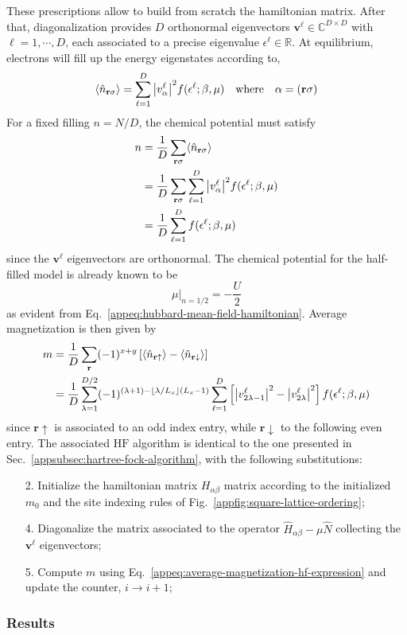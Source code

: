 These prescriptions allow to build from scratch the hamiltonian matrix. After that, diagonalization provides $D$ orthonormal eigenvectors $\mathbf{v}^\ell \in \mathbb{C}^{D \times D}$ with $\ell=1,\cdots,D$, each associated to a precise eigenvalue $\epsilon^\ell \in \mathbb{R}$. At equilibrium, electrons will fill up the energy eigenstates according to,
\[
	\langle
		\hat n_{\mathbf{r}\sigma}
	\rangle = \sum_{\ell=1}^D \abs{v_\alpha^\ell}^2 f(\epsilon^\ell;\beta,\mu)
	\qq{where}
	\alpha = (\mathbf{r}\sigma)
\]
For a fixed filling $n = N/D$, the chemical potential must satisfy
\[
\begin{aligned}
	n &= \frac{1}{D} \sum_{\mathbf{r}\sigma} \langle
		\hat n_{\mathbf{r}\sigma}
	\rangle \\
	&= \frac{1}{D} \sum_{\mathbf{r}\sigma} \sum_{\ell=1}^D \abs{v_\alpha^\ell}^2 f(\epsilon^\ell;\beta,\mu) \\
	&= \frac{1}{D} \sum_{\ell=1}^D f(\epsilon^\ell;\beta,\mu)
\end{aligned} 
\]
since the $\mathbf{v}^\ell$ eigenvectors are orthonormal. The chemical potential for the half-filled model is already known to be
\[
	\mu \big|_{n=1/2} = -\frac{U}{2}
\]
as evident from Eq.~\eqref{appeq:hubbard-mean-field-hamiltonian}. Average magnetization is then given by
\begin{align}
	m &= \frac{1}{D} \sum_{\mathbf{r}} (-1)^{x+y} \left[
		\langle
			\hat n_{\mathbf{r}\uparrow}
			\rangle - \langle
			\hat n_{\mathbf{r}\downarrow}
		\rangle
	\right] \nonumber \\
	&= \frac{1}{D} \sum_{\lambda=1}^{D/2} (-1)^{
		(\lambda+1) - \left\lfloor
			\lambda / L_x
		\right\rfloor (L_x-1)
	} \sum_{\ell=1}^D \left[
		\abs{v_{2\lambda-1}^\ell}^2 - \abs{v_{2\lambda}^\ell}^2
	\right] f(\epsilon^\ell;\beta,\mu) \label{appeq:average-magnetization-hf-expression}
\end{align}
since $\mathbf{r}\uparrow$ is associated to an odd index entry, while $\mathbf{r}\downarrow$ to the following even entry. The associated $\mathrm{HF}$ algorithm is identical to the one presented in Sec.~\ref{appsubsec:hartree-fock-algorithm}, with the following substitutions:
\begin{enumerate}
	\item[2.] Initialize the hamiltonian matrix $H_{\alpha\beta}$ matrix according to the initialized $m_0$ and the site indexing rules of Fig.~\ref{appfig:square-lattice-ordering};
	\item[4.] Diagonalize the matrix associated to the operator $\hat H_{\alpha\beta}-\mu \hat N$ collecting the $\mathbf{v}^\ell$ eigenvectors;
	\item[5.] Compute $m$ using Eq.~\eqref{appeq:average-magnetization-hf-expression} and update the counter, $i \to i+1$;
\end{enumerate}

\subsubsection{Results}
\todo